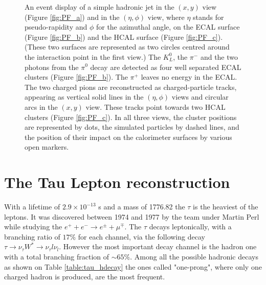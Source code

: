 \begin{figure}
	\caption{An event display of a simple hadronic jet in the $(x, y)$ view (Figure \ref{fig:PF_a}) and in the $(\eta,\phi)$ view, where $\eta$ stands for pseudo-rapidity and $\phi$ for the azimuthal angle, on the ECAL surface (Figure \ref{fig:PF_b}) and the HCAL surface (Figure \ref{fig:PF_c}). (These two surfaces are represented as two circles centred around the interaction point in the first view.) The $K^{0}_{L}$, the $\pi^{-}$ and the two photons from the $\pi^{0}$ decay are detected as four well separated ECAL clusters (Figure \ref{fig:PF_b}). The $\pi^{+}$ leaves no energy in the ECAL. The two charged pions are reconstructed as charged-particle tracks, appearing as vertical solid lines in the $(\eta,\phi)$ views and circular arcs in the $(x, y)$ view. These tracks point towards two HCAL clusters (Figure \ref{fig:PF_c}). In all three views, the cluster positions are represented by dots, the simulated particles by dashed lines, and the position of their impact on the calorimeter surfaces by various open markers.}
	\label{fig:PF_event_display}
\end{figure}

\clearpage

\section {The Tau Lepton reconstruction}

With a lifetime of $2.9\times10^{−13}$ s and a mass of 1776.82 \mev the $\tau$ is the heaviest of the leptons. It was discovered between 1974 and 1977 by the team under Martin Perl while studying the $e^{+}+e^{-}\longrightarrow e^{\pm}+\mu^{\mp}$. The $\tau$ decays leptonically, with a branching ratio of $17\%$ for each channel, via the following decay $\tau\longrightarrow\nu_{\tau}W^{*}\longrightarrow\nu_{\tau}l\nu_{l}$. However the most important decay channel is the hadron one with a total branching fraction of $\sim 65\%$. Among all the possible hadronic decays as shown on Table \ref{table:tau_hdecay} the ones called "one-prong", where only one charged hadron is produced, are the most frequent.


